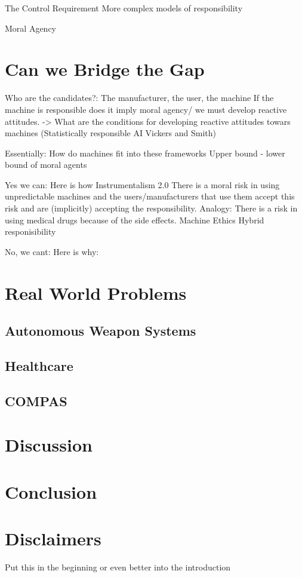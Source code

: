 \documentclass{article}
\begin{document}
The Control Requirement
More complex models of responsibility

Moral Agency
\section{Can we Bridge the Gap}

Who are the candidates?: The manufacturer, the user, the machine
If the machine is responsible does it imply moral agency/ we must develop
reactive attitudes. -> What are the conditions for developing reactive attitudes
towars machines (Statistically responsible AI Vickers and Smith)

Essentially: How do machines fit into these frameworks
Upper bound - lower bound of moral agents

Yes we can: Here is how
Instrumentalism 2.0
	There is a moral risk in using unpredictable machines and the
	users/manufacturers that use them accept this risk and are (implicitly)
	accepting the responsibility. Analogy: There is a risk in using medical
	drugs because of the side effects.
Machine Ethics
Hybrid responisibility

No, we cant: Here is why:

\section{Real World Problems}
\subsection{Autonomous Weapon Systems}
\subsection{Healthcare}
\subsection{COMPAS}
\section{Discussion}
\section{Conclusion}
\section{Disclaimers}
Put this in the beginning or even better into the introduction
\end{document}
